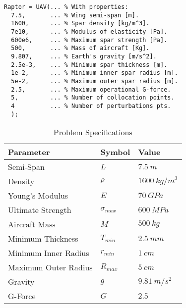 \documentclass{article}
\begin{document}
\begin{lstlisting}[caption=UAV Instantiation, label=UAV, float]
% Instantiate the wing
Raptor = UAV(... % With properties:
  7.5,       ... % Wing semi-span [m].
  1600,      ... % Spar density [kg/m^3].
  7e10,      ... % Modulus of elasticity [Pa].
  600e6,     ... % Maximum spar strength [Pa].
  500,       ... % Mass of aircraft [Kg].
  9.807,     ... % Earth's gravity [m/s^2].
  2.5e-3,    ... % Minimum spar thickness [m].
  1e-2,      ... % Minimum inner spar radius [m].
  5e-2,      ... % Maximum outer spar radius [m].
  2.5,       ... % Maximum operational G-force.
  5,         ... % Number of collocation points.
  4          ... % Number of perturbations pts.
  );
\end{lstlisting}

\begin{table}
\centering
\caption{Problem Specifications}
\begin{tabular}{|l|l|l|}
\hline
Parameter            & Symbol    & Value         \\ \hline
Semi-Span            & $L$       & $7.5~m$       \\ \hline
Density              & $\rho$    & $1600~kg/m^3$ \\ \hline
Young's Modulus      & $E$       & $70~GPa$      \\ \hline
Ultimate Strength             & $\sigma_{max}$  & $600~MPa$     \\ \hline
Aircraft Mass                 & $M$       & $500~kg$      \\ \hline
Minimum Thickness    & $T_{min}$ & $2.5~mm$      \\ \hline
Minimum Inner Radius & $r_{min}$ & $1~cm$        \\ \hline
Maximum Outer Radius & $R_{max}$ & $5~cm$        \\ \hline
Gravity              & $g$       & $9.81~m/s^2$  \\ \hline
G-Force              & $G$       & $2.5$         \\ \hline
\end{tabular}
\label{specs}
\end{table}
\end{document}
